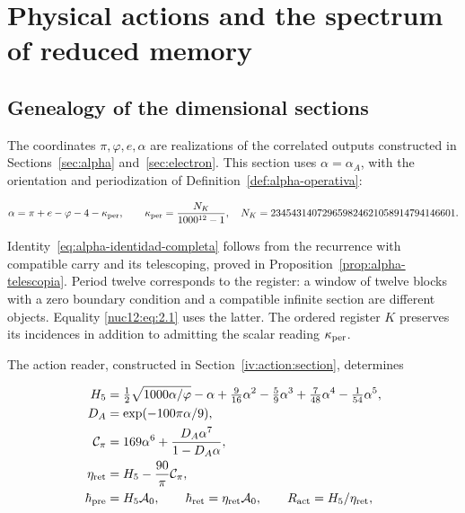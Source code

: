 \section{Physical actions and the spectrum of reduced memory}
\label{nuclear:12}
\subsection{Genealogy of the dimensional sections}

The coordinates \(\pi,\varphi,e,\alpha\) are realizations of the correlated outputs constructed in Sections~\ref{sec:alpha} and~\ref{sec:electron}. This section uses \(\alpha=\alpha_A\), with the orientation and periodization of Definition~\ref{def:alpha-operativa}:

\begin{equation}
\alpha=\pi+e-\varphi-4-\kappa_{\rm per},\qquad
\kappa_{\rm per}=\frac{N_K}{1000^{12}-1},
\quad N_K=234543140729659824621058914794146601.
\label{nuc12:eq:2.1}
\end{equation}

Identity~\eqref{eq:alpha-identidad-completa} follows from the recurrence with compatible carry and its telescoping, proved in Proposition~\ref{prop:alpha-telescopia}. Period twelve corresponds to the register: a window of twelve blocks with a zero boundary condition and a compatible infinite section are different objects. Equality \eqref{nuc12:eq:2.1} uses the latter. The ordered register \(K\) preserves its incidences in addition to admitting the scalar reading \(\kappa_{\rm per}\).

The action reader, constructed in Section~\ref{iv:action:section}, determines

\begin{equation}
\begin{aligned}
H_5&=\tfrac12\sqrt{1000\alpha/\varphi}-\alpha+
\tfrac9{16}\alpha^2-\tfrac59\alpha^3+
\tfrac7{48}\alpha^4-\tfrac1{54}\alpha^5,\\
D_A&=\exp(-100\pi\alpha/9),\\
\mathcal C_\pi&=169\alpha^6+\frac{D_A\alpha^7}{1-D_A\alpha},\\
\eta_{\rm ret}&=H_5-\frac{90}{\pi}\mathcal C_\pi,\\
\hbar_{\rm pre}&=H_5\mathcal A_0,\qquad
\hbar_{\rm ret}=\eta_{\rm ret}\mathcal A_0,\qquad
R_{\rm act}=H_5/\eta_{\rm ret},
\end{aligned}
\label{nuc12:eq:2.2}
\end{equation}

